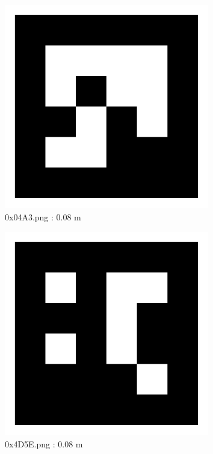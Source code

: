 \documentclass[11pt,a4,BCOR=0cm]{scrartcl}
\begin{document}
\begin{figure}
  \centering
    \includegraphics[width=8.955cm]{0x04A3.pdf}
    \caption{0x04A3.png : 0.08 m}
    \label{fig:0x04A3.pdf}
  
\end{figure} 

\begin{figure}
  \centering
    \includegraphics[width=8.955cm]{0x4D5E.pdf}
    \caption{0x4D5E.png : 0.08 m}
    \label{fig:0x4D5E.pdf}
  
\end{figure} 

\clearpage
\end{document}
